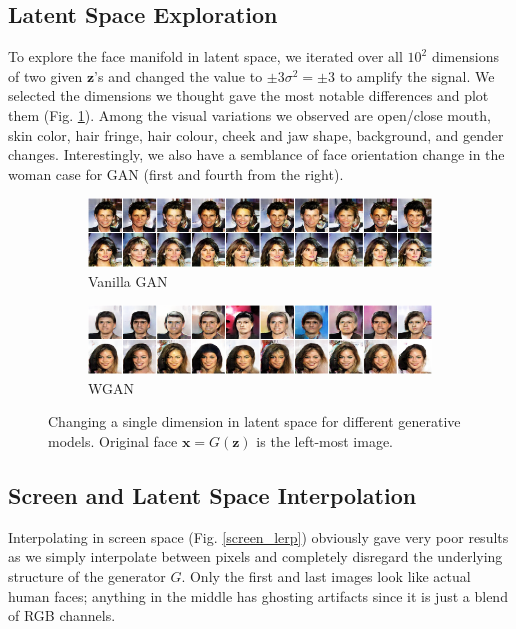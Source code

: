 \documentclass[table]{article}
\def\*#1{\mathbf{#1}}
\begin{document}
\subsection{Latent Space Exploration}
To explore the face manifold in latent space, we iterated over all $10^2$ dimensions of two given $\*z$'s and changed the value to $\pm 3\sigma^2 = \pm 3$ to amplify the signal. We selected the dimensions we thought gave the most notable differences and plot them (Fig. \ref{latent_explore}). Among the visual variations we observed are open/close mouth, skin color, hair fringe, hair colour, cheek and jaw shape, background, and gender changes. Interestingly, we also have a semblance of face orientation change in the woman case for GAN (first and fourth from the right).
\begin{figure}[ht]
  \centering
  \begin{subfigure}{\textwidth}
    \centering
    \includegraphics[scale=0.5]{imgs/gan_latent_play}
    \caption{Vanilla GAN}
  \end{subfigure}

  \vspace*{3mm}
  \begin{subfigure}{\textwidth}
    \centering
    \includegraphics[scale=0.5]{imgs/wgan_latent_play}
    \caption{WGAN}
  \end{subfigure}
  \caption{Changing a single dimension in latent space for different generative models. Original face $\*x = G(\*z)$ is the left-most image.}
  \label{latent_explore}
\end{figure}


\subsection{Screen and Latent Space Interpolation}
Interpolating in screen space (Fig. \ref{screen_lerp}) obviously gave very poor results as we simply interpolate between pixels and completely disregard the underlying structure of the generator $G$. Only the first and last images look like actual human faces; anything in the middle has ghosting artifacts since it is just a blend of RGB channels.
\end{document}
